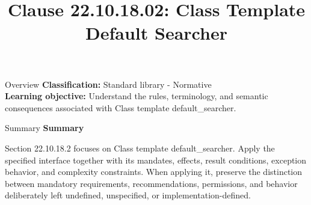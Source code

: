 \documentclass[10pt,letterpaper]{article}
\title{Clause 22.10.18.02: Class Template Default Searcher}
\author{}
\date{}
\begin{document}
\maketitle
\begin{CornellOverviewBox}{Overview}
\textbf{Classification:} Standard library - Normative\\[2pt]
\textbf{Learning objective:} Understand the rules, terminology, and semantic consequences associated with Class template default\_searcher.
\end{CornellOverviewBox}\begin{CornellSummaryBox}{Summary}
{\sffamily\bfseries\color{Accent} Summary}\par\vspace{3pt}Section 22.10.18.2 focuses on Class template default\_searcher. Apply the specified interface together with its mandates, effects, result conditions, exception behavior, and complexity constraints. When applying it, preserve the distinction between mandatory requirements, recommendations, permissions, and behavior deliberately left undefined, unspecified, or implementation-defined.
\end{CornellSummaryBox}
\end{document}
